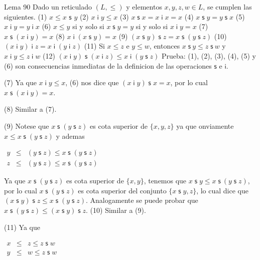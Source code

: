 Lema 90 Dado un reticulado \((L,\leq )\) y elementos \(x,y,z,w\in L\), se cumplen las siguientes.
(1) \(x\leq x\) \(\mathsf{s}\) \(y\)
(2) \(x\;\mathsf{i\;}y\leq x\)
(3) \(x\;\mathsf{s}\;x=x\mathsf{\;i\;}x=x\)
(4) \(x\;\mathsf{s}\;y=y\;\mathsf{s}\;x\)
(5) \(x\mathsf{\;i\;}y=y\mathsf{\;i\;}x\)
(6) \(x\leq y\) si y solo si \(x\;\mathsf{s}\;y=y\) si y solo si \(x \mathsf{\;i\;}y=x\)
(7) \(x\;\mathsf{s}\;(x\mathsf{\;i\;}y)=x\)
(8) \(x\mathsf{\;i\;}(x\;\mathsf{s}\;y)=x\)
(9) \((x\;\mathsf{s}\;y)\;\mathsf{s}\;z=x\;\mathsf{s}\;(y\;\mathsf{s} \;z)\)
(10) \((x\mathsf{\;i\;}y)\mathsf{\;i\;}z=x\mathsf{\;i\;}(y\mathsf{\;i\; }z)\)
(11) Si \(x\leq z\) e \(y\leq w\), entonces \(x\;\mathsf{s}\ y\leq z\; \mathsf{s}\ w\) y \(x\mathsf{\;i\;}y\leq z\mathsf{\;i\;}w\)
(12) \((x\mathsf{\;i\;}y)\;\mathsf{s}\;(x\mathsf{\;i\;}z)\leq x\mathsf{ \;i\;}(y\;\mathsf{s}\;z)\)
Prueba: (1), (2), (3), (4), (5) y (6) son consecuencias inmediatas de la definicion de las operaciones \(\mathsf{s}\) e \(\mathsf{i}\).

(7) Ya que \(x\mathsf{\;i\;}y\leq x\), (6) nos dice que \((x\mathsf{\;i\;}y)\; \mathsf{s}\;x=x\), por lo cual \(x\;\mathsf{s}\;(x\mathsf{\;i\;}y)=x\).

(8) Similar a (7).

(9) Notese que \(x\;\mathsf{s}\;(y\;\mathsf{s}\;z)\) es cota superior de \( \{x,y,z\}\) ya que onviamente \(x\leq x\;\mathsf{s}\;(y\;\mathsf{s}\;z)\) y ademas

\(\displaystyle \begin{array}{rcl} y & \leq & (y\;\mathsf{s}\;z)\leq x\;\mathsf{s}\;(y\;\mathsf{s}\;z) \\ z & \leq & (y\;\mathsf{s}\;z)\leq x\;\mathsf{s}\;(y\;\mathsf{s}\;z) \end{array} \)

Ya que \(x\;\mathsf{s}\;(y\;\mathsf{s}\;z)\) es cota superior de \(\{x,y\}\), tenemos que \(x\;\mathsf{s}\;y\leq x\;\mathsf{s}\ (y\;\mathsf{s}\;z)\), por lo cual \(x\;\mathsf{s}\;(y\;\mathsf{s}\;z)\) es cota superior del conjunto \(\{x\; \mathsf{s}\;y,z\}\), lo cual dice que \((x\;\mathsf{s}\;y)\;\mathsf{s}\;z\leq x\;\mathsf{s}\;(y\;\mathsf{s}\;z)\). Analogamente se puede probar que \(x\; \mathsf{s}\;(y\;\mathsf{s}\;z)\leq (x\;\mathsf{s}\;y)\;\mathsf{s}\;z\).
(10) Similar a (9).

(11) Ya que

\(\displaystyle \begin{array}{rcl} x & \leq & z\leq z\;\mathsf{s}\;w \\ y & \leq & w\leq z\;\mathsf{s}\;w \end{array} \)

